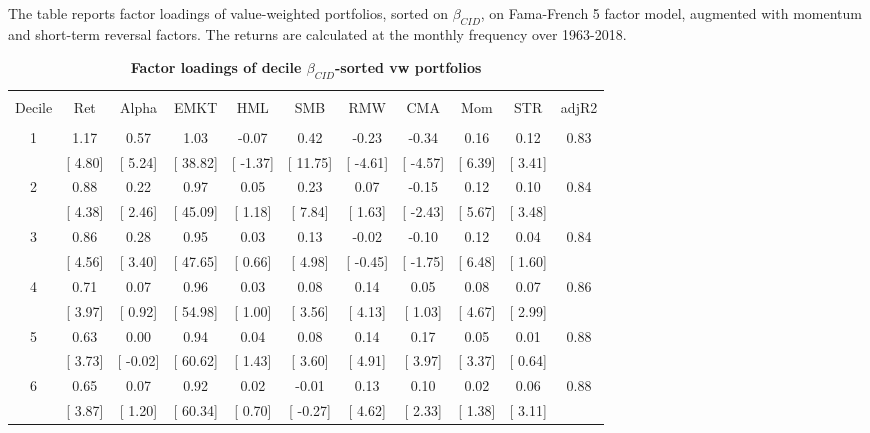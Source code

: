 \documentclass[12pt]{article}
\begin{document}
\begin{table}[!htbp] \centering 
  \caption{\textbf{Factor loadings of decile $\beta_{CID}$-sorted vw portfolios}} 
  \label{} 
  \begin{flushleft}
    {\medskip\small
 The table reports factor loadings of value-weighted portfolios, sorted on $\beta_{CID}$, on Fama-French 5 factor model, augmented with momentum and short-term reversal factors. The returns are calculated at the monthly frequency over 1963-2018.}
    \medskip
    \end{flushleft}
\begin{tabular}{@{\extracolsep{0pt}} ccccccccccc} 
\\[-1.8ex]\hline 
\hline \\[-1.8ex] 
Decile & Ret & Alpha & EMKT & HML & SMB & RMW & CMA & Mom & STR & adjR2 \\ 
\hline \\[-1.8ex] 
1 & 1.17 & 0.57 & 1.03 & -0.07 & 0.42 & -0.23 & -0.34 & 0.16 & 0.12 & 0.83 \\ 
 & [ 4.80] & [ 5.24] & [ 38.82] & [ -1.37] & [ 11.75] & [ -4.61] & [ -4.57] & [ 6.39] & [ 3.41] &  \\ 
2 & 0.88 & 0.22 & 0.97 & 0.05 & 0.23 & 0.07 & -0.15 & 0.12 & 0.10 & 0.84 \\ 
 & [ 4.38] & [ 2.46] & [ 45.09] & [ 1.18] & [ 7.84] & [ 1.63] & [ -2.43] & [ 5.67] & [ 3.48] &  \\ 
3 & 0.86 & 0.28 & 0.95 & 0.03 & 0.13 & -0.02 & -0.10 & 0.12 & 0.04 & 0.84 \\ 
 & [ 4.56] & [ 3.40] & [ 47.65] & [ 0.66] & [ 4.98] & [ -0.45] & [ -1.75] & [ 6.48] & [ 1.60] &  \\ 
4 & 0.71 & 0.07 & 0.96 & 0.03 & 0.08 & 0.14 & 0.05 & 0.08 & 0.07 & 0.86 \\ 
 & [ 3.97] & [ 0.92] & [ 54.98] & [ 1.00] & [ 3.56] & [ 4.13] & [ 1.03] & [ 4.67] & [ 2.99] &  \\ 
5 & 0.63 & 0.00 & 0.94 & 0.04 & 0.08 & 0.14 & 0.17 & 0.05 & 0.01 & 0.88 \\ 
 & [ 3.73] & [ -0.02] & [ 60.62] & [ 1.43] & [ 3.60] & [ 4.91] & [ 3.97] & [ 3.37] & [ 0.64] &  \\ 
6 & 0.65 & 0.07 & 0.92 & 0.02 & -0.01 & 0.13 & 0.10 & 0.02 & 0.06 & 0.88 \\ 
 & [ 3.87] & [ 1.20] & [ 60.34] & [ 0.70] & [ -0.27] & [ 4.62] & [ 2.33] & [ 1.38] & [ 3.11] &  \\ 

\end{tabular}
\end{table}
\end{document}
